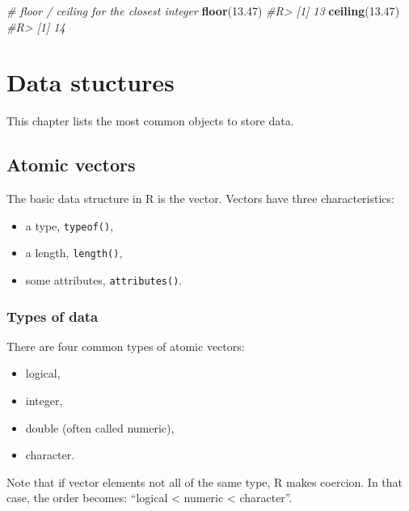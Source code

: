 \documentclass[]{book}
\newenvironment{Shaded}{}{}
\newcommand{\CommentTok}[1]{\textcolor[rgb]{0.38,0.63,0.69}{\textit{#1}}}
\newcommand{\FloatTok}[1]{\textcolor[rgb]{0.25,0.63,0.44}{#1}}
\newcommand{\KeywordTok}[1]{\textcolor[rgb]{0.00,0.44,0.13}{\textbf{#1}}}
\newcommand{\NormalTok}[1]{#1}
\providecommand{\tightlist}{%
  \setlength{\itemsep}{0pt}\setlength{\parskip}{0pt}}
\theoremstyle{definition}
\theoremstyle{definition}
\theoremstyle{definition}
\theoremstyle{remark}
\begin{document}
\begin{Shaded}
\begin{Highlighting}[]
\CommentTok{# floor / ceiling for the closest integer}
\KeywordTok{floor}\NormalTok{(}\FloatTok{13.47}\NormalTok{)}
\CommentTok{#R> [1] 13}
\KeywordTok{ceiling}\NormalTok{(}\FloatTok{13.47}\NormalTok{)}
\CommentTok{#R> [1] 14}
\end{Highlighting}
\end{Shaded}

\hypertarget{datastructures}{%
\chapter{Data stuctures}\label{datastructures}}

This chapter lists the most common objects to store data.

\hypertarget{atomic-vectors}{%
\section{Atomic vectors}\label{atomic-vectors}}

The basic data structure in R is the vector. Vectors have three
characteristics:

\begin{itemize}
\tightlist
\item
  a type, \texttt{typeof()},
\item
  a length, \texttt{length()},
\item
  some attributes, \texttt{attributes()}.
\end{itemize}

\hypertarget{types-of-data}{%
\subsection{Types of data}\label{types-of-data}}

There are four common types of atomic vectors:

\begin{itemize}
\tightlist
\item
  logical,
\item
  integer,
\item
  double (often called numeric),
\item
  character.
\end{itemize}

Note that if vector elements not all of the same type, R makes coercion.
In that case, the order becomes: ``logical \textless{} numeric
\textless{} character''.
\end{document}
